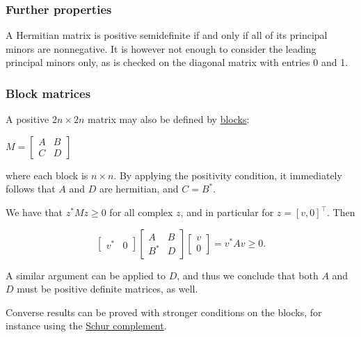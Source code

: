 \hypertarget{further-properties}{%
\subsubsection{Further properties}\label{further-properties}}

A Hermitian matrix is positive semidefinite if and only if all of its
principal minors are nonnegative. It is however not enough to consider
the leading principal minors only, as is checked on the diagonal matrix
with entries 0 and 1.

\hypertarget{block-matrices}{%
\subsubsection{Block matrices}\label{block-matrices}}

A positive \(2n \times 2n\) matrix may also be defined by
\href{block_matrix}{blocks}:

\begin{description}
\item
\(M =  \begin{bmatrix} A & B \\ C & D \end{bmatrix}\)
\end{description}

where each block is \(n \times n\). By applying the positivity
condition, it immediately follows that \(A\) and \(D\) are hermitian,
and \(C = B^*\).

We have that \(z^* Mz \ge 0\) for all complex \(z\), and in particular
for \(z = [v, 0]^\top \). Then

\[\begin{bmatrix} v^* & 0 \end{bmatrix} \begin{bmatrix} A & B \\ B^* & D \end{bmatrix} \begin{bmatrix} v \\ 0 \end{bmatrix} = v^* Av \ge 0.\]


A similar argument can be applied to \(D\), and thus we conclude that
both \(A\) and \(D\) must be positive definite matrices, as well.

Converse results can be proved with stronger conditions on the blocks,
for instance using the
\href{Schur_complement\#Schur_complement_condition_for_positive_definiteness}{Schur
complement}.

